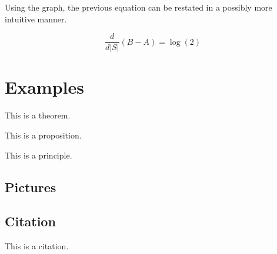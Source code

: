 \documentclass{article}
\begin{document}
Using the graph, the previous equation can be restated in a possibly more intuitive manner.

\begin{equation}
	\frac{d}{d|S|}(B-A)=\log(2)
\end{equation}


\section{Examples}

\begin{theorem}
    This is a theorem.
\end{theorem}

\begin{proposition}
    This is a proposition.
\end{proposition}

\begin{principle}
    This is a principle.
\end{principle}


\subsection{Pictures}


\subsection{Citation}

This is a citation\cite{Eg}.

\newpage





\end{document}
